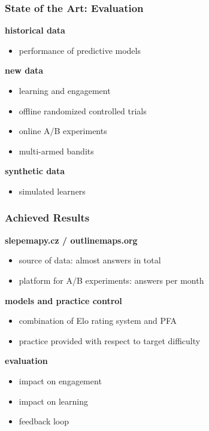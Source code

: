 \documentclass[xcolor=svgnames]{beamer}
\renewcommand{\cite}[1]{{\small\parencite{#1}}}
\begin{document}
\begin{frame}
	\frametitle{State of the Art: Evaluation}
	\textbf{historical data}
	\begin{itemize}
		\item performance of predictive models\\\cite{pelanek2014brief, huang2015framework}
	\end{itemize}
	\textbf{new data}
	\begin{itemize}
		\item learning and engagement
		\item offline randomized controlled trials~\cite{dimitrov2003pretest}
		\item online A/B experiments~\cite{stamper2012rise}
		\item multi-armed bandits~\cite{liu2014trading}
	\end{itemize}
	\textbf{synthetic data}
	\begin{itemize}
		\item simulated learners~\cite{fancsali2013optimal}
	\end{itemize}
\end{frame}
\begin{frame}
	\frametitle{Achieved Results}
	\textbf{slepemapy.cz / outlinemaps.org}
	\begin{itemize}
		\item source of data: almost  answers in total
		\item platform for A/B experiments:  answers per month
	\end{itemize}
	\textbf{models and practice control}
	\begin{itemize}
		\item combination of Elo rating system and PFA
		\item practice provided with respect to target difficulty\\\cite{papousek2014adaptive}
	\end{itemize}
	\textbf{evaluation}
	\begin{itemize}
		\item impact on engagement~\cite{papousek2015impact}
		\item impact on learning~\cite{papousek2016evaluation}
		\item feedback loop~\cite{niznan2015exploring, pelanek2016impact}
	\end{itemize}
\end{frame}
\end{document}
